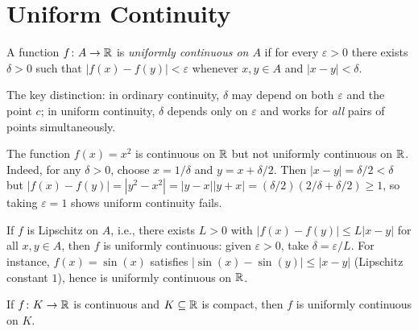 \documentclass[11pt,a4paper]{article}
\begin{document}
\section{Uniform Continuity}
\label{sec:uniform_cont}

\begin{definition}
\label{def:uniform_cont}
A function $f \colon A \to \mathbb{R}$ is \emph{uniformly continuous on $A$} if
for every $\varepsilon > 0$ there exists $\delta > 0$ such that
$|f(x) - f(y)| < \varepsilon$ whenever $x, y \in A$ and
$|x - y| < \delta$.
\end{definition}

\begin{remark}
\label{rem:cont_vs_uniform}
The key distinction: in ordinary continuity, $\delta$ may depend on both
$\varepsilon$ and the point $c$; in uniform continuity, $\delta$ depends
only on $\varepsilon$ and works for \emph{all} pairs of points
simultaneously.
\end{remark}

\begin{example}
\label{ex:not_uniform}
The function $f(x) = x^2$ is continuous on $\mathbb{R}$ but not uniformly
continuous on $\mathbb{R}$. Indeed, for any $\delta > 0$, choose $x = 1/\delta$
and $y = x + \delta/2$. Then $|x - y| = \delta/2 < \delta$ but
$|f(x) - f(y)| = |y^2 - x^2| = |y - x||y + x| =
(\delta/2)(2/\delta + \delta/2) \ge 1$,
so taking $\varepsilon = 1$ shows uniform continuity fails.
\end{example}

\begin{example}
\label{ex:lipschitz_uniform}
If $f$ is Lipschitz on $A$, i.e., there exists $L > 0$ with
$|f(x) - f(y)| \le L|x - y|$ for all $x, y \in A$, then $f$ is
uniformly continuous: given $\varepsilon > 0$, take $\delta =
\varepsilon / L$. For instance, $f(x) = \sin(x)$ satisfies
$|\sin(x) - \sin(y)| \le |x - y|$ (Lipschitz constant $1$), hence is
uniformly continuous on $\mathbb{R}$.
\end{example}

\begin{theorem}
\label{thm:compact_uniform}
If $f \colon K \to \mathbb{R}$ is continuous and $K \subseteq \mathbb{R}$ is compact,
then $f$ is uniformly continuous on $K$.
\end{theorem}
\end{document}
